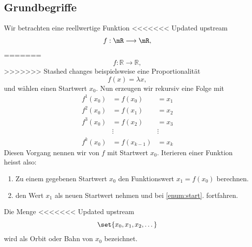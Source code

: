 \documentclass[%
<<<<<<< Updated upstream
<<<<<<< Updated upstream
11pt,%
twoside,%
titlepage,%
german,%
headsepline%
]{scrartcl}
\begin{document}
\subsection{Grundbegriffe}

Wir betrachten eine reellwertige Funktion
<<<<<<< Updated upstream
$$f:\mR\longrightarrow\mR,$$
=======
$$f:\mathbb{R}\longrightarrow\mathbb{R},$$
>>>>>>> Stashed changes
beispielsweise eine Proportionalität
$$f(x)=\lambda x,$$
und wählen einen Startwert $x_0$. Nun erzeugen wir rekursiv eine Folge mit
\begin{align*}
f^1(x_0) &= f(x_0) &= x_1\\
f^2(x_0) &= f(x_1) &= x_2\\
f^3(x_0) &= f(x_2) &= x_3\\
&\vdots &\vdots \phantom{x_k} \\
f^k(x_0) &= f(x_{k-1}) &= x_k
\end{align*}
Diesen
Vorgang nennen wir  von $f$ mit Startwert $x_0$. Iterieren einer Funktion heisst also:
\begin{enumerate}
\item\label{enum:start} Zu einem gegebenen Startwert $x_0$ den Funktionswert $x_1=f(x_0)$ berechnen.
\item den Wert $x_1$ als neuen Startwert nehmen und bei \ref{enum:start}. fortfahren.
\end{enumerate}
\begin{cdef}[Orbit]
Die Menge
<<<<<<< Updated upstream
$$\set{x_0,x_1,x_2,\dots}$$
wird als Orbit oder Bahn von $x_0$ bezeichnet.
\end{cdef}
\end{document}
